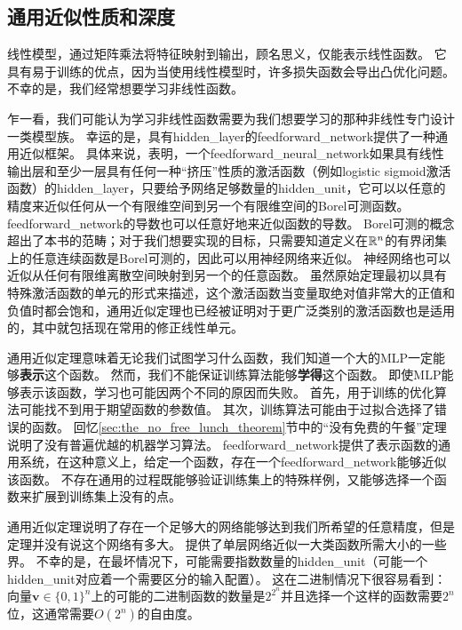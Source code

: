 \subsection{通用近似性质和深度}
\label{sec:universal_approximation_properties_and_depth}

线性模型，通过矩阵乘法将特征映射到输出，顾名思义，仅能表示线性函数。
它具有易于训练的优点，因为当使用线性模型时，许多损失函数会导出凸优化问题。
不幸的是，我们经常想要学习非线性函数。

乍一看，我们可能认为学习非线性函数需要为我们想要学习的那种非线性专门设计一类模型族。
幸运的是，具有\gls{hidden_layer}的\gls{feedforward_network}提供了一种通用近似框架。
具体来说，\citep{Hornik89,Cybenko89}表明，一个\gls{feedforward_neural_network}如果具有线性输出层和至少一层具有任何一种``挤压''性质的激活函数（例如logistic sigmoid激活函数）的\gls{hidden_layer}，只要给予网络足够数量的\gls{hidden_unit}，它可以以任意的精度来近似任何从一个有限维空间到另一个有限维空间的Borel可测函数。
\gls{feedforward_network}的导数也可以任意好地来近似函数的导数\citep{hornik1990universal}。
Borel可测的概念超出了本书的范畴；对于我们想要实现的目标，只需要知道定义在$\mathbb{R}^n$的有界闭集上的任意连续函数是Borel可测的，因此可以用神经网络来近似。
神经网络也可以近似从任何有限维离散空间映射到另一个的任意函数。
虽然原始定理最初以具有特殊激活函数的单元的形式来描述，这个激活函数当变量取绝对值非常大的正值和负值时都会饱和，通用近似定理也已经被证明对于更广泛类别的激活函数也是适用的，其中就包括现在常用的修正线性单元\citep{Leshno-et-al-1993}。


通用近似定理意味着无论我们试图学习什么函数，我们知道一个大的MLP一定能够\textbf{表示}这个函数。
然而，我们不能保证训练算法能够\textbf{学得}这个函数。
即使MLP能够表示该函数，学习也可能因两个不同的原因而失败。
首先，用于训练的优化算法可能找不到用于期望函数的参数值。
其次，训练算法可能由于过拟合选择了错误的函数。
回忆\ref{sec:the_no_free_lunch_theorem}节中的``没有免费的午餐''定理说明了没有普遍优越的机器学习算法。
\gls{feedforward_network}提供了表示函数的通用系统，在这种意义上，给定一个函数，存在一个\gls{feedforward_network}能够近似该函数。
不存在通用的过程既能够验证训练集上的特殊样例，又能够选择一个函数来扩展到训练集上没有的点。

通用近似定理说明了存在一个足够大的网络能够达到我们所希望的任意精度，但是定理并没有说这个网络有多大。
\cite{Barron93}提供了单层网络近似一大类函数所需大小的一些界。
不幸的是，在最坏情况下，可能需要指数数量的\gls{hidden_unit}（可能一个\gls{hidden_unit}对应着一个需要区分的输入配置）。
这在二进制情况下很容易看到：向量$\bm{v}\in \{0,1\}^n$上的可能的二进制函数的数量是$2^{2^n}$并且选择一个这样的函数需要$2^n$位，这通常需要$O(2^n)$的自由度。

